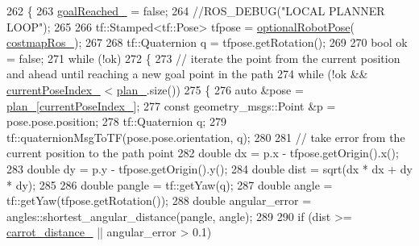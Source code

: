 \begin{DoxyCode}
262 \{
263     \hyperlink{classcl__move__base__z_1_1forward__local__planner_1_1ForwardLocalPlanner_a9d51ad6f0eb364ebd830526280bdf4fc}{goalReached\_} = \textcolor{keyword}{false};
264     \textcolor{comment}{//ROS\_DEBUG("LOCAL PLANNER LOOP");}
265 
266     tf::Stamped<tf::Pose> tfpose = \hyperlink{namespacecl__move__base__z_1_1forward__local__planner_a4c20f9fe0ca67779c53e90182baf4997}{optionalRobotPose}(
      \hyperlink{classcl__move__base__z_1_1forward__local__planner_1_1ForwardLocalPlanner_a37791fea67ce92c6e38e3727311e533b}{costmapRos\_});
267 
268     tf::Quaternion q = tfpose.getRotation();
269 
270     \textcolor{keywordtype}{bool} ok = \textcolor{keyword}{false};
271     \textcolor{keywordflow}{while} (!ok)
272     \{
273         \textcolor{comment}{// iterate the point from the current position and ahead until reaching a new goal point in the
       path}
274         \textcolor{keywordflow}{while} (!ok && \hyperlink{classcl__move__base__z_1_1forward__local__planner_1_1ForwardLocalPlanner_af4019077a7661d10957cca16222547c2}{currentPoseIndex\_} < \hyperlink{classcl__move__base__z_1_1forward__local__planner_1_1ForwardLocalPlanner_a929e5d0a9db3027810beb658a2343560}{plan\_}.size())
275         \{
276             \textcolor{keyword}{auto} &pose = \hyperlink{classcl__move__base__z_1_1forward__local__planner_1_1ForwardLocalPlanner_a929e5d0a9db3027810beb658a2343560}{plan\_}[\hyperlink{classcl__move__base__z_1_1forward__local__planner_1_1ForwardLocalPlanner_af4019077a7661d10957cca16222547c2}{currentPoseIndex\_}];
277             \textcolor{keyword}{const} geometry\_msgs::Point &p = pose.pose.position;
278             tf::Quaternion q;
279             tf::quaternionMsgToTF(pose.pose.orientation, q);
280 
281             \textcolor{comment}{// take error from the current position to the path point}
282             \textcolor{keywordtype}{double} dx = p.x - tfpose.getOrigin().x();
283             \textcolor{keywordtype}{double} dy = p.y - tfpose.getOrigin().y();
284             \textcolor{keywordtype}{double} dist = sqrt(dx * dx + dy * dy);
285 
286             \textcolor{keywordtype}{double} pangle = tf::getYaw(q);
287             \textcolor{keywordtype}{double} angle = tf::getYaw(tfpose.getRotation());
288             \textcolor{keywordtype}{double} angular\_error = angles::shortest\_angular\_distance(pangle, angle);
289 
290             \textcolor{keywordflow}{if} (dist >= \hyperlink{classcl__move__base__z_1_1forward__local__planner_1_1ForwardLocalPlanner_a4101afebb7e2a5eb0a2144a5fb553a92}{carrot\_distance\_} || angular\_error > 0.1)

\end{DoxyCode}
